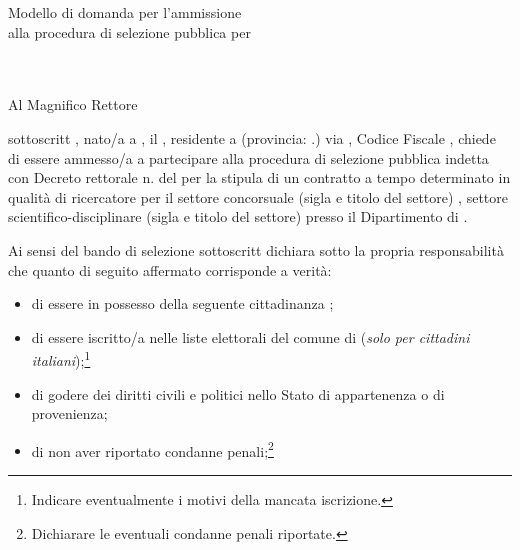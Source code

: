 \documentclass[a4paper,10pt]{article}
\begin{document}
\begin{Form}
\begin{minipage}{.5\textwidth}
 Modello di domanda per l'ammissione	\\[3pt]
 alla  procedura di selezione pubblica per\\[3pt]
 \titleTextField{}\\[3pt]
 \titleTextField{}\\[3pt]
\end{minipage}

\begin{flushright}
\begin{minipage}{.45\textwidth}
 \flushright Al Magnifico Rettore
 \flushright {}
 \flushright \myTextField[.9\textwidth]{}
 \flushright \myTextField[.9\textwidth]{}%
\end{minipage}
\end{flushright}

\myTextField[.5cm]{} sottoscritt\myTextField[.5cm]{} \myTextField[4cm]{}, 
nato/a a \myTextField{}, il \myTextField{}, residente a \myTextField{} 
(provincia: \myTextField{}.) via \myTextField{}, Codice Fiscale 
\myTextField[4cm]{}, chiede di essere ammesso/a a partecipare alla procedura 
di selezione pubblica indetta con Decreto rettorale n. \myTextField{} del 
\myTextField{} per la stipula di un contratto a tempo determinato in qualità 
di ricercatore per il settore concorsuale (sigla e titolo del settore) \myTextField{}, 
settore scientifico-disciplinare (sigla e titolo  del settore) \myTextField{} 
presso il Dipartimento di \myTextField[4cm]{}.

Ai sensi del bando di selezione  \myTextField[.5cm]{} sottoscritt\myTextField[.5cm]{} 
dichiara sotto la propria responsabilità che quanto di seguito affermato 
corrisponde a verità:
\begin{itemize}
 \item di essere in possesso della seguente cittadinanza \myTextField{};
\item di essere iscritto/a nelle liste elettorali del comune di \myTextField{} 
(\emph{solo per cittadini italiani});\footnote{Indicare eventualmente i motivi 
della mancata iscrizione.}

\myTextField[.9\textwidth]{}
\item di godere dei diritti civili e politici nello Stato di appartenenza o di 
provenienza;
\item di non aver riportato condanne penali;\footnote{Dichiarare le eventuali 
condanne penali riportate.}


\end{itemize}
\end{Form}
\end{document}
